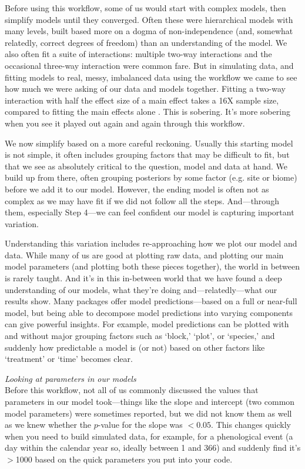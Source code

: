 \documentclass[11pt]{article}
\begin{document}
Before using this workflow, some of us would start with complex models, then simplify models until they converged. Often these were hierarchical models with many levels, built based more on a dogma of non-independence (and, somewhat relatedly, correct degrees of freedom) than an understanding of the model. We also often fit a suite of interactions: multiple two-way interactions and the occasional three-way interaction were common fare. But in simulating data, and fitting models to real, messy, imbalanced data using the workflow we came to see how much we were asking of our data and models together. Fitting a two-way interaction with half the effect size of a main effect takes a 16X sample size, compared to fitting the main effects alone \citep[which then average over the interactions][]{regotherstories}. This is sobering. It's more sobering when you see it played out again and again through this workflow. 

We now simplify based on a more careful reckoning. Usually this starting model is not simple, it often includes grouping factors that may be difficult to fit, but that we see as absolutely critical to the question, model and data at hand. We build up from there, often grouping posteriors by some factor (e.g. site or biome) before we add it to our model. However, the ending model is often not as complex as we may have fit if we did not follow all the steps. And---through them, especially Step 4---we can feel confident our model is capturing important variation. 

Understanding this variation includes re-approaching how we plot our model and data. While many of us are good at plotting raw data, and plotting our main model parameters (and plotting both these pieces together), the world in between is rarely taught. And it's in this in-between world that we have found a deep understanding of our models, what they're doing and---relatedly---what our results show. Many packages offer model predictions---based on a full or near-full model, but being able to decompose model predictions into varying components can give powerful insights. For example, model predictions can be plotted with and without major grouping factors such as `block,' `plot', or `species,' and suddenly how predictable a model is (or not) based on other factors like `treatment' or `time' becomes clear. 

 \emph{Looking at parameters in our models} \\
Before this workflow, not all of us commonly discussed the values that parameters in our model took---things like the slope and intercept (two common model parameters) were sometimes reported, but we did not know them as well as we knew whether the $p$-value for the slope was $<0.05$. This changes quickly when you need to build simulated data, for example, for a phenological event (a day within the calendar year so, ideally between 1 and 366) and suddenly find it's $>$1000 based on the quick parameters you put into your code. 
\end{document}
